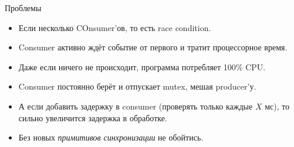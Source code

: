 \begin{frame}{Проблемы}
	\begin{itemize}
		\item Если несколько COnsumer'ов, то есть race condition.
		\item Consumer активно ждёт событие от первого и тратит процессорное время.
		\item Даже если ничего не происходит, программа потребляет 100\% CPU.
		\item Consumer постоянно берёт и отпускает mutex, мешая producer'у.
		\pause
		\item
			А если добавить задержку в consumer (проверять только каждые $X$ мс),
			то сильно увеличится задержка в обработке.
		\item Без новых \textit{примитивов синхронизации} не обойтись.
	\end{itemize}
\end{frame}
